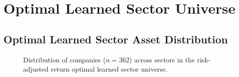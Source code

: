 \documentclass[../main.tex]{subfiles}
\begin{document}
\chapter{Optimal Learned Sector Universe} \label{appendix:optimal_ls}

\section{Optimal Learned Sector Asset Distribution}

\begin{figure}[h]
    \centering
    \caption{Distribution of companies ($n = 362$) across sectors in the risk-adjusted return optimal learned sector universe.}
    \label{fig:appendix:optimal_ls:ls_sector_distribution}
\end{figure}

%

\end{document}
